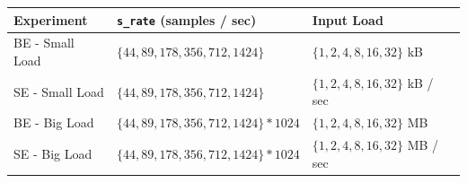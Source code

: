 \documentclass[10pt,    %
    english,            %
    xcolor=table,       %
    envcountsect,        %
    aspectratio=169     %
]{beamer}
\begin{document}
\begin{frame}
    \begin{table}[t]
        \centering
        \begin{tabular}{L{2.8cm}C{5.5cm}C{4.2cm}}
            \hline
            \textbf{Experiment} & \footnotesize{\textbf{\texttt{s\_rate} (samples / sec)}} & \textbf{Input Load} \\[3pt]
            \hline
            BE - Small Load & $\lbrace 44, 89, 178, 356, 712, 1424 \rbrace $ & $\lbrace 1, 2, 4, 8, 16, 32 \rbrace$ kB \\[3pt]
            SE - Small Load & $\lbrace 44, 89, 178, 356, 712, 1424 \rbrace$ & $\lbrace 1, 2, 4, 8, 16, 32 \rbrace$ kB / sec\\[3pt]
            BE - Big Load & $\lbrace 44, 89, 178, 356, 712, 1424 \rbrace * 1024$ & $\lbrace 1, 2, 4, 8, 16, 32 \rbrace$ MB \\[3pt]
            SE - Big Load & $\lbrace 44, 89, 178, 356, 712, 1424 \rbrace * 1024$ & $\lbrace 1, 2, 4, 8, 16, 32 \rbrace$ MB / sec\\[3pt]
            \hline
        \end{tabular}
    \end{table}

\end{frame}

%
%
%
\end{document}
